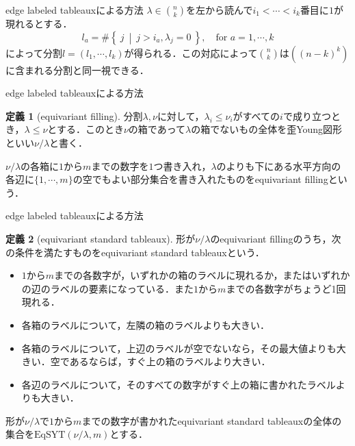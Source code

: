 \documentclass[unicode,12pt]{beamer}%
\theoremstyle{definition}
\newtheorem{defin}{定義}[section]
\theoremstyle{example}
\newcommand{\set}[2]{\left\{\:#1\:\middle|\:#2\:\right\}}
\begin{document}
\begin{frame}{edge labeled tableauxによる方法}
  $\lambda\in\binom{n}{k}$を左から読んで$i_1<\cdots<i_k$番目に$1$が現れるとする．
  \[
  l_a = \#\set{j}{j > i_a, \lambda_j = 0},\quad \text{for }a = 1,\cdots,k
  \]
  によって分割$l=(l_1,\cdots,l_k)$が得られる．この対応によって$\binom{n}{k}$は$((n-k)^k)$に含まれる分割と同一視できる．
  \begin{figure}
    \center
  \end{figure}
\end{frame}

\begin{frame}{edge labeled tableauxによる方法}
  \begin{defin}[equivariant filling]
    分割$\lambda, \nu$に対して，$\lambda_i\leq\nu_i$がすべての$i$で成り立つとき，$\lambda\leq\nu$とする．このとき$\nu$の箱であって$\lambda$の箱でないもの全体を歪Young図形といい$\nu/\lambda$と書く．

  $\nu/\lambda$の各箱に$1$から$m$までの数字を$1$つ書き入れ，$\lambda$のよりも下にある水平方向の各辺に$\{1,\cdots,m\}$の空でもよい部分集合を書き入れたものをequivariant fillingという．
  \end{defin}
\end{frame}

\begin{frame}{edge labeled tableauxによる方法}
  \footnotesize
  \begin{defin}[equivariant standard tableaux]
    形が$\nu/\lambda$のequivariant fillingのうち，次の条件を満たすものをequivariant standard tableauxという．
  \begin{itemize}
    \item $1$から$m$までの各数字が，いずれかの箱のラベルに現れるか，またはいずれかの辺のラベルの要素になっている．また$1$から$m$までの各数字がちょうど1回現れる．
    \item 各箱のラベルについて，左隣の箱のラベルよりも大きい．
    \item 各箱のラベルについて，上辺のラベルが空でないなら，その最大値よりも大きい．空であるならば，すぐ上の箱のラベルより大きい．
    \item 各辺のラベルについて，そのすべての数字がすぐ上の箱に書かれたラベルよりも大きい．
  \end{itemize}
  形が$\nu/\lambda$で$1$から$m$までの数字が書かれたequivariant standard tableauxの全体の集合を$\text{EqSYT}(\nu/\lambda, m)$とする．
  \end{defin}
  \normalsize
\end{frame}
\end{document}
